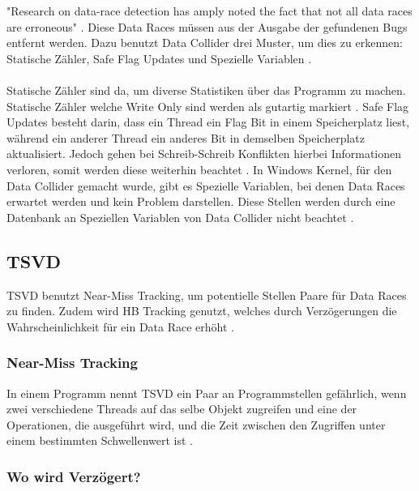 "Research on data-race detection has amply noted the fact that not all data races are erroneous" \cite[8]{erickson_effective_nodate}. Diese Data Races müssen aus der Ausgabe der gefundenen Bugs entfernt werden. Dazu benutzt Data Collider drei Muster, um dies zu erkennen: Statische Zähler, Safe Flag Updates und Spezielle Variablen \cite[vgl.][8]{erickson_effective_nodate}.\\
\\
Statische Zähler sind da, um diverse Statistiken über das Programm zu machen. Statische Zähler welche Write Only sind werden als gutartig markiert \cite[vgl.][8]{erickson_effective_nodate}. Safe Flag Updates besteht darin, dass ein Thread ein Flag Bit in einem Speicherplatz liest, während ein anderer Thread ein anderes Bit in demselben Speicherplatz aktualisiert. Jedoch gehen bei Schreib-Schreib Konflikten hierbei Informationen verloren, somit werden diese weiterhin beachtet \cite[vgl.][8]{erickson_effective_nodate}. In Windows Kernel, für den Data Collider gemacht wurde, gibt es Spezielle Variablen, bei denen Data Races erwartet werden und kein Problem darstellen. Diese Stellen werden durch eine Datenbank an Speziellen Variablen von Data Collider nicht beachtet \cite[vgl.][8]{erickson_effective_nodate}.

\subsection{TSVD}

\ac{TSVD} benutzt Near-Miss Tracking, um potentielle Stellen Paare für Data Races zu finden. Zudem wird \acs{HB} Tracking genutzt, welches durch Verzögerungen die Wahrscheinlichkeit für ein Data Race erhöht \cite[vgl.][163]{li_efficient_2019}.

\subsubsection*{Near-Miss Tracking}

In einem Programm nennt \acs{TSVD} ein Paar an Programmstellen gefährlich, wenn zwei verschiedene Threads auf das selbe Objekt zugreifen und eine der Operationen, die ausgeführt wird, und die Zeit zwischen den Zugriffen unter einem bestimmten Schwellenwert ist \cite[vgl.][168]{li_efficient_2019}.  

\subsubsection*{Wo wird Verzögert?}

